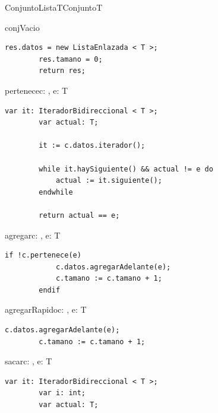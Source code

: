 \begin{module}{ConjuntoLista}{T}{Conjunto}{T}



	\begin{proc}{conjVacio}{}{\moduletype}
		\begin{lstlisting}[numbers=none,frame=none]
		res.datos = new ListaEnlazada < T >;
		res.tamano = 0;
		return res;
		\end{lstlisting}
	\end{proc}

	\begin{proc}{pertenece}{\In c: \moduletype, \In e: T}{\bool}
		\begin{lstlisting}[numbers=none,frame=none]
		var it: IteradorBidireccional < T >;
		var actual: T;

		it := c.datos.iterador();

		while it.haySiguiente() && actual != e do
			actual := it.siguiente();
		endwhile
		
		return actual == e;
		\end{lstlisting}
	\end{proc}

	\begin{proc}{agregar}{\Inout c: \moduletype, \In e: T}{}
		\begin{lstlisting}[numbers=none,frame=none]
		if !c.pertenece(e)
			c.datos.agregarAdelante(e);
			c.tamano := c.tamano + 1;
		endif
		\end{lstlisting}
	\end{proc}

	\begin{proc}{agregarRapido}{\Inout c: \moduletype, \In e: T}{}
		\begin{lstlisting}[numbers=none,frame=none]
		c.datos.agregarAdelante(e);
		c.tamano := c.tamano + 1;
		\end{lstlisting}
	\end{proc}

	\pagebreak

	\begin{proc}{sacar}{\Inout c: \moduletype, \In e: T}{}
		\begin{lstlisting}[numbers=none,frame=none]
		var it: IteradorBidireccional < T >;
		var i: int;
		var actual: T;


\end{lstlisting}
\end{proc}
\end{module}
